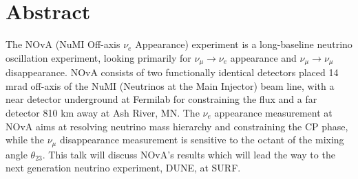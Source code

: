 \documentclass[12pt,letterpaper,oneside,openright]{book}
\begin{document}
\chapter*{\centering Abstract}
\begin{sloppypar}
The NOvA (NuMI Off-axis $\nu_e$ Appearance) experiment is a long-baseline neutrino oscillation experiment, looking primarily for $\nu_\mu\rightarrow \nu_e$ appearance and $\nu_\mu\rightarrow \nu_\mu$ disappearance. NOvA consists of two functionally identical detectors placed 14 mrad off-axis of the NuMI (Neutrinos at the Main Injector) beam line, with a near detector underground at Fermilab for constraining the flux and a far detector 810 km away at Ash River, MN. The $\nu_e$ appearance measurement at NOvA aims at resolving neutrino mass hierarchy and constraining the CP phase, while the $\nu_\mu$ disappearance measurement is sensitive to the octant of the mixing angle $\theta_{23}$. This talk will discuss NOvA's results which will lead the way to the next generation neutrino experiment, DUNE, at SURF.
\end{sloppypar}
\end{document}
